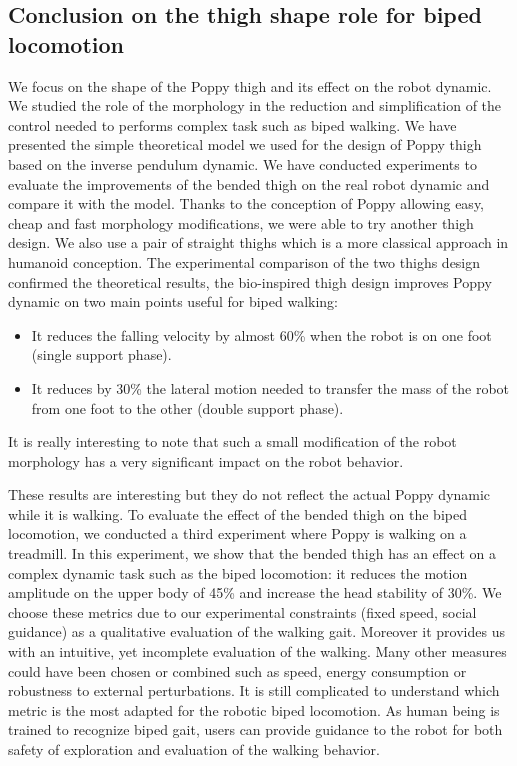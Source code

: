 \subsection{Conclusion on the thigh shape role for biped locomotion} %
We focus on the shape of the Poppy thigh and its effect on the robot dynamic. We studied the role of the morphology in the reduction and simplification of the control needed to performs complex task such as biped walking. We have presented the simple theoretical model we used for the design of Poppy thigh based on the inverse pendulum dynamic. We have conducted experiments to evaluate the improvements of the bended thigh on the real robot dynamic and compare it with the model. Thanks to the conception of Poppy allowing easy, cheap and fast morphology modifications, we were able to try another thigh design. We also use a pair of straight thighs which is a more classical approach in humanoid conception. The experimental comparison of the two thighs design confirmed the theoretical results, the bio-inspired thigh design improves Poppy dynamic on two main points useful for biped walking:
\begin{itemize}
    \item It reduces the falling velocity by almost 60\% when the robot is on one foot (single support phase).
    \item It reduces by 30\% the lateral motion needed to transfer the mass of the robot from one foot to the other (double support phase).
\end{itemize}
It is really interesting to note that such a small modification of the robot morphology has a very significant impact on the robot behavior.

These results are interesting but they do not reflect the actual Poppy dynamic while it is walking. To evaluate the effect of the bended thigh on the biped locomotion, we conducted a third experiment where Poppy is walking on a treadmill. In this experiment, we show that the bended thigh has an effect on a complex dynamic task such as the biped locomotion: it reduces the motion amplitude on the upper body of 45\% and increase the head stability of 30\%. We choose these metrics due to our experimental constraints (fixed speed, social guidance) as a qualitative evaluation of the walking gait. Moreover it provides us with an intuitive, yet incomplete evaluation of the walking. Many other measures could have been chosen or combined such as speed, energy consumption or robustness to external perturbations. It is still complicated to understand which metric is the most adapted for the robotic biped locomotion. As human being is trained to recognize biped gait, users can provide guidance to the robot for both safety of exploration and evaluation of the walking behavior.


